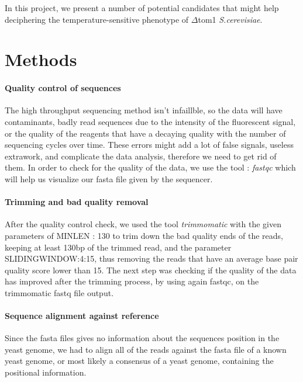 \documentclass[10pt,a4paper]{article}
\begin{document}
In this project, we present a number of potential candidates that might help deciphering the temperature-sensitive phenotype of $ \Delta $tom1 \textit{S.cerevisiae}.


\section*{Methods}

\paragraph{Quality control of sequences} The high throughput sequencing method isn’t infaillble, so the data will have contaminants, badly read sequences due to the intensity of the fluorescent signal, or the quality of the reagents that have a decaying quality with the number of sequencing cycles over time\cite{abnizova_computational_2017}. These errors might add a lot of false signals, useless extrawork, and complicate the data analysis, therefore we need to get rid of them. 
In order to check for the quality of the data, we use the tool : \textit{fastqc}\cite{andrews2012} which will help us visualize our fasta file given by the sequencer. \\


\paragraph{Trimming and bad quality removal } After the quality control check, we used the tool \textit{trimmomatic}\cite{bolger_trimmomatic:_2014} with the given parameters of MINLEN : 130 to trim down the bad quality ends of the reads, keeping at least 130bp of the trimmed read, and the parameter SLIDINGWINDOW:4:15, thus removing the reads that have an average base pair quality score lower than 15. The next step was checking if the quality of the data has improved after the trimming process, by using again fastqc, on the trimmomatic fastq file output.

\paragraph{Sequence alignment against reference} Since the fasta files gives no information about the sequences position in the yeast genome, we had to align all of the reads against the fasta file of a known yeast genome, or most likely a consensus of a yeast genome, containing the positional information.\\
 
\end{document}
